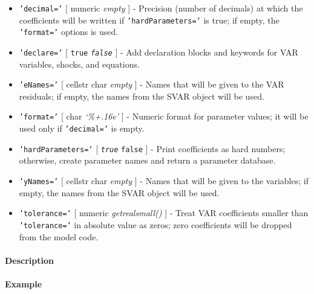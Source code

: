  \begin{itemize}
 \item
   \texttt{'decimal='} {[} numeric \textbar{} \emph{empty} {]} -
   Precision (number of decimals) at which the coefficients will be
   written if \texttt{'hardParameters='} is true; if empty, the
   \texttt{'format='} options is used.
 \item
   \texttt{'declare='} {[} \texttt{true} \textbar{} \emph{\texttt{false}}
   {]} - Add declaration blocks and keywords for VAR variables, shocks,
   and equations.
 \item
   \texttt{'eNames='} {[} cellstr \textbar{} char \textbar{} \emph{empty}
   {]} - Names that will be given to the VAR residuals; if empty, the
   names from the SVAR object will be used.
 \item
   \texttt{'format='} {[} char \textbar{} \emph{`\%+.16e'} {]} - Numeric
   format for parameter values; it will be used only if
   \texttt{'decimal='} is empty.
 \item
   \texttt{'hardParameters='} {[} \emph{\texttt{true}} \textbar{}
   \texttt{false} {]} - Print coefficients as hard numbers; otherwise,
   create parameter names and return a parameter database.
 \item
   \texttt{'yNames='} {[} cellstr \textbar{} char \textbar{} \emph{empty}
   {]} - Names that will be given to the variables; if empty, the names
   from the SVAR object will be used.
 \item
   \texttt{'tolerance='} {[} numeric \textbar{} \emph{getrealsmall()} {]}
   - Treat VAR coefficients smaller than \texttt{'tolerance='} in
   absolute value as zeros; zero coefficients will be dropped from the
   model code.
 \end{itemize}
 
 \paragraph{Description}
 
 \paragraph{Example}


